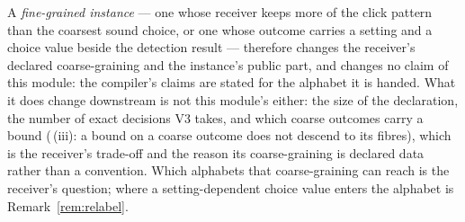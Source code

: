 \begin{remark}
A \emph{fine-grained instance} --- one whose receiver keeps more of the click
pattern than the coarsest sound choice, or one whose outcome carries a
setting and a choice value beside the detection result --- therefore changes
the receiver's declared coarse-graining and the instance's public part, and
changes no claim of this module: the compiler's claims are stated for the
alphabet it is handed. What it does change downstream is not this module's
either: the size of the declaration, the number of exact decisions V3 takes,
and which coarse outcomes carry a bound
(\,(iii): a bound on a coarse outcome does
not descend to its fibres), which is the receiver's trade-off and the reason
its coarse-graining is declared data rather than a convention. Which
alphabets that coarse-graining can reach is the receiver's question; where a
setting-dependent choice value enters the alphabet is
Remark~\ref{rem:relabel}.
\end{remark}
